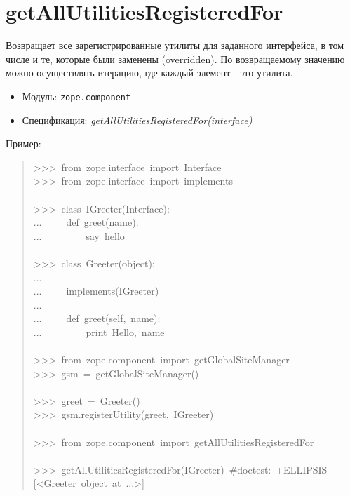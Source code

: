 \documentclass[a4paper,openany,twoside,final]{book}
\providecommand*{\DUroletitlereference}[1]{\textsl{#1}}
\begin{document}
\section*{getAllUtilitiesRegisteredFor%
  \label{getallutilitiesregisteredfor}%
}

Возвращает все зарегистрированные утилиты для заданного интерфейса, в
том числе и те, которые были заменены (overridden).  По возвращаемому
значению можно осуществлять итерацию, где каждый элемент - это утилита.

\begin{itemize}

\item Модуль: \texttt{zope.component}

\item Спецификация: \DUroletitlereference{getAllUtilitiesRegisteredFor(interface)}

\end{itemize}

Пример:

\begin{quote}{\ttfamily \raggedright \noindent
>{}>{}>~from~zope.interface~import~Interface\\
>{}>{}>~from~zope.interface~import~implements\\
~\\
>{}>{}>~class~IGreeter(Interface):\\
...~~~~~def~greet(name):\\
...~~~~~~~~~\textquotedbl{}say~hello\textquotedbl{}\\
~\\
>{}>{}>~class~Greeter(object):\\
...\\
...~~~~~implements(IGreeter)\\
...\\
...~~~~~def~greet(self,~name):\\
...~~~~~~~~~print~\textquotedbl{}Hello\textquotedbl{},~name\\
~\\
>{}>{}>~from~zope.component~import~getGlobalSiteManager\\
>{}>{}>~gsm~=~getGlobalSiteManager()\\
~\\
>{}>{}>~greet~=~Greeter()\\
>{}>{}>~gsm.registerUtility(greet,~IGreeter)\\
~\\
>{}>{}>~from~zope.component~import~getAllUtilitiesRegisteredFor\\
~\\
>{}>{}>~getAllUtilitiesRegisteredFor(IGreeter)~\#doctest:~+ELLIPSIS\\
{[}<Greeter~object~at~...>{]}
}
\end{quote}
\end{document}
